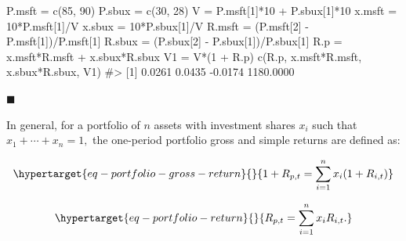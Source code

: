 \documentclass[
  letterpaper,
  DIV=11,
  numbers=noendperiod]{scrreprt}
\newenvironment{Shaded}{\begin{snugshade}}{\end{snugshade}}
\newcommand{\CommentTok}[1]{\textcolor[rgb]{0.37,0.37,0.37}{#1}}
\newcommand{\DecValTok}[1]{\textcolor[rgb]{0.68,0.00,0.00}{#1}}
\newcommand{\FunctionTok}[1]{\textcolor[rgb]{0.28,0.35,0.67}{#1}}
\newcommand{\NormalTok}[1]{\textcolor[rgb]{0.00,0.23,0.31}{#1}}
\newcommand{\OtherTok}[1]{\textcolor[rgb]{0.00,0.23,0.31}{#1}}
\newcommand{\SpecialCharTok}[1]{\textcolor[rgb]{0.37,0.37,0.37}{#1}}
\theoremstyle{definition}
\theoremstyle{definition}
\theoremstyle{remark}
\begin{document}
\begin{Shaded}
\begin{Highlighting}[]
\NormalTok{P.msft }\OtherTok{=} \FunctionTok{c}\NormalTok{(}\DecValTok{85}\NormalTok{, }\DecValTok{90}\NormalTok{) }
\NormalTok{P.sbux }\OtherTok{=} \FunctionTok{c}\NormalTok{(}\DecValTok{30}\NormalTok{, }\DecValTok{28}\NormalTok{) }
\NormalTok{V }\OtherTok{=}\NormalTok{ P.msft[}\DecValTok{1}\NormalTok{]}\SpecialCharTok{*}\DecValTok{10} \SpecialCharTok{+}\NormalTok{ P.sbux[}\DecValTok{1}\NormalTok{]}\SpecialCharTok{*}\DecValTok{10}
\NormalTok{x.msft }\OtherTok{=} \DecValTok{10}\SpecialCharTok{*}\NormalTok{P.msft[}\DecValTok{1}\NormalTok{]}\SpecialCharTok{/}\NormalTok{V }
\NormalTok{x.sbux }\OtherTok{=} \DecValTok{10}\SpecialCharTok{*}\NormalTok{P.sbux[}\DecValTok{1}\NormalTok{]}\SpecialCharTok{/}\NormalTok{V }
\NormalTok{R.msft }\OtherTok{=}\NormalTok{ (P.msft[}\DecValTok{2}\NormalTok{] }\SpecialCharTok{{-}}\NormalTok{ P.msft[}\DecValTok{1}\NormalTok{])}\SpecialCharTok{/}\NormalTok{P.msft[}\DecValTok{1}\NormalTok{] }
\NormalTok{R.sbux }\OtherTok{=}\NormalTok{ (P.sbux[}\DecValTok{2}\NormalTok{] }\SpecialCharTok{{-}}\NormalTok{ P.sbux[}\DecValTok{1}\NormalTok{])}\SpecialCharTok{/}\NormalTok{P.sbux[}\DecValTok{1}\NormalTok{] }
\NormalTok{R.p }\OtherTok{=}\NormalTok{ x.msft}\SpecialCharTok{*}\NormalTok{R.msft }\SpecialCharTok{+}\NormalTok{ x.sbux}\SpecialCharTok{*}\NormalTok{R.sbux }
\NormalTok{V1 }\OtherTok{=}\NormalTok{ V}\SpecialCharTok{*}\NormalTok{(}\DecValTok{1} \SpecialCharTok{+}\NormalTok{ R.p) }
\FunctionTok{c}\NormalTok{(R.p, x.msft}\SpecialCharTok{*}\NormalTok{R.msft, x.sbux}\SpecialCharTok{*}\NormalTok{R.sbux, V1)}
\CommentTok{\#\textgreater{} [1]    0.0261    0.0435   {-}0.0174 1180.0000}
\end{Highlighting}
\end{Shaded}

\hfill{}\(\blacksquare\)

In general, for a portfolio of \(n\) assets with investment shares
\(x_{i}\) such that \(x_{1}+\cdots+x_{n}=1,\) the one-period portfolio
gross and simple returns are defined as:

\begin{equation}\protect\hypertarget{eq-portfolio-gross-return}{}{
1+R_{p,t} =\sum_{i=1}^{n}x_{i}(1+R_{i,t})
}\label{eq-portfolio-gross-return}\end{equation}

\begin{equation}\protect\hypertarget{eq-portfolio-return}{}{
R_{p,t} =\sum_{i=1}^{n}x_{i}R_{i,t}.
}\label{eq-portfolio-return}\end{equation}
\end{document}
